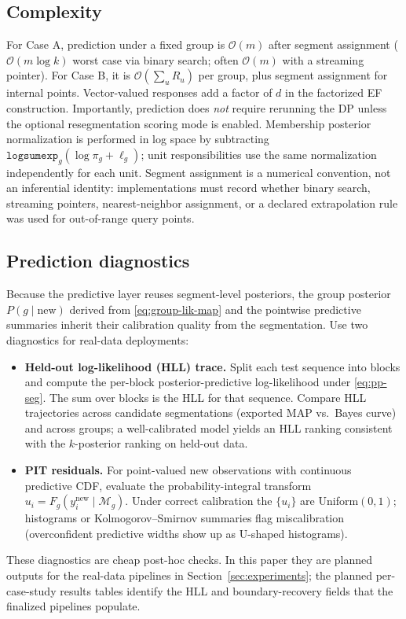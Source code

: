 \subsection{Complexity}
For Case A, prediction under a fixed group is $\mathcal{O}(m)$ after segment assignment
($\mathcal{O}(m\log k)$ worst case via binary search; often $\mathcal{O}(m)$ with a streaming pointer).
For Case B, it is $\mathcal{O}(\sum_u R_u)$ per group, plus segment assignment for internal points.
Vector-valued responses add a factor of $d$ in the factorized EF construction. Importantly,
prediction does \emph{not} require rerunning the DP unless the optional resegmentation scoring
mode is enabled.
Membership posterior normalization is performed in log space by subtracting
$\texttt{logsumexp}_g(\log\pi_g+\ell_g)$; unit responsibilities use the same normalization
independently for each unit. Segment assignment is a numerical convention, not an inferential
identity: implementations must record whether binary search, streaming pointers, nearest-neighbor
assignment, or a declared extrapolation rule was used for out-of-range query points.
\subsection{Prediction diagnostics}
\label{sec:prediction-diagnostics}

Because the predictive layer reuses segment-level posteriors, the group posterior
$P(g\mid\text{new})$ derived from \eqref{eq:group-lik-map} and the pointwise predictive summaries
inherit their calibration quality from the segmentation. Use two diagnostics for real-data
deployments:
\begin{itemize}\itemsep2pt
\item \textbf{Held-out log-likelihood (HLL) trace.} Split each test sequence into blocks and
compute the per-block posterior-predictive log-likelihood under \eqref{eq:pp-seg}. The sum over
blocks is the HLL for that sequence. Compare HLL trajectories across candidate segmentations
(exported MAP vs.\ Bayes curve) and across groups; a well-calibrated model yields an HLL
ranking consistent with the $k$-posterior ranking on held-out data.
\item \textbf{PIT residuals.} For point-valued new observations with continuous predictive CDF,
evaluate the probability-integral transform $u_i=F_g(y_i^{\text{new}}\mid\mathcal{M}_g)$.
Under correct calibration the $\{u_i\}$ are Uniform$(0,1)$; histograms or Kolmogorov--Smirnov
summaries flag miscalibration (overconfident predictive widths show up as U-shaped histograms).
\end{itemize}
These diagnostics are cheap post-hoc checks. In this paper they are planned outputs
for the real-data pipelines in Section~\ref{sec:experiments}; the planned per-case-study results tables
identify the HLL and boundary-recovery fields that the finalized pipelines populate.

